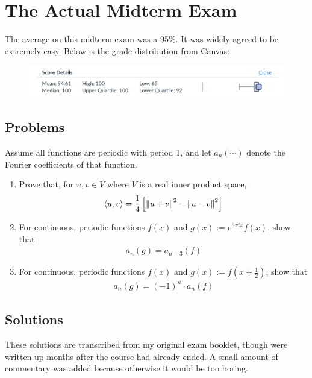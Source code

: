 \section{The Actual Midterm Exam}
The average on this midterm exam was a 95\%. It was widely agreed to be extremely easy. Below is the grade distribution from Canvas:
\begin{figure}[H]
    \centering
    \includegraphics[width=1\linewidth]{image.png}
\end{figure}
\subsection{Problems}
Assume all functions are periodic with period 1, and let $a_n\left(\cdots\right)$ denote the Fourier coefficients of that function.
\begin{enumerate}
    \item Prove that, for $u, v \in V$ where $V$ is a real inner product space,
    \begin{align*}
        \langle u, v \rangle = \dfrac{1}{4} \left[ \norm{u+v}^2 - \norm{u-v}^2 \right]
    \end{align*}
    \item For continuous, periodic functions $f(x)$ and $g(x) := e^{6\pi ix} f(x)$, show that
    \begin{align*}
        a_n(g) = a_{n-3}(f)
    \end{align*}
    \item For continuous, periodic functions $f(x)$ and $g(x) := f(x+\frac{1}{2})$, show that
    \begin{align*}
        a_n(g) = (-1)^n \cdot a_n(f)
    \end{align*}
\end{enumerate}
\subsection{Solutions}
These solutions are transcribed from my original exam booklet, though were written up months after the course had already ended. A small amount of commentary was added because otherwise it would be too boring.
